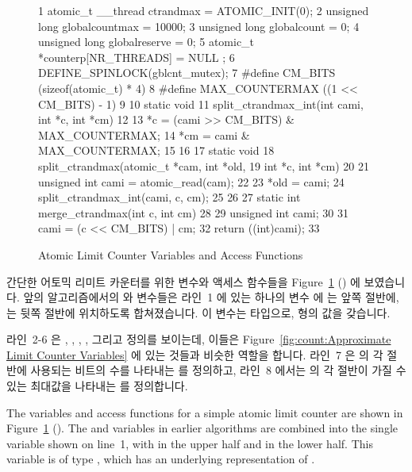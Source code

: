 \begin{figure}[tbp]
{ \scriptsize
\begin{verbbox}
  1 atomic_t __thread ctrandmax = ATOMIC_INIT(0);
  2 unsigned long globalcountmax = 10000;
  3 unsigned long globalcount = 0;
  4 unsigned long globalreserve = 0;
  5 atomic_t *counterp[NR_THREADS] = { NULL };
  6 DEFINE_SPINLOCK(gblcnt_mutex);
  7 #define CM_BITS (sizeof(atomic_t) * 4)
  8 #define MAX_COUNTERMAX ((1 << CM_BITS) - 1)
  9 
 10 static void
 11 split_ctrandmax_int(int cami, int *c, int *cm)
 12 {
 13   *c = (cami >> CM_BITS) & MAX_COUNTERMAX;
 14   *cm = cami & MAX_COUNTERMAX;
 15 }
 16 
 17 static void
 18 split_ctrandmax(atomic_t *cam, int *old,
 19                     int *c, int *cm)
 20 {
 21   unsigned int cami = atomic_read(cam);
 22 
 23   *old = cami;
 24   split_ctrandmax_int(cami, c, cm);
 25 }
 26 
 27 static int merge_ctrandmax(int c, int cm)
 28 {
 29   unsigned int cami;
 30 
 31   cami = (c << CM_BITS) | cm;
 32   return ((int)cami);
 33 }
\end{verbbox}
}
\centering
\theverbbox
\caption{Atomic Limit Counter Variables and Access Functions}
\label{fig:count:Atomic Limit Counter Variables and Access Functions}
\end{figure}

간단한 어토믹 리미트 카운터를 위한 변수와 액세스 함수들을
Figure~\ref{fig:count:Atomic Limit Counter Variables and Access Functions}
() 에 보였습니다.
앞의 알고리즘에서의  와  변수들은 라인~1 에 있는
하나의 변수  에  는 앞쪽 절반에,  는
뒷쪽 절반에 위치하도록 합쳐졌습니다.
이 변수는  타입으로,  형의 값을 갖습니다.

라인~2-6 은 , , ,
, 그리고  정의를 보이는데, 이들은
Figure~\ref{fig:count:Approximate Limit Counter Variables} 에 있는 것들과
비슷한 역할을 합니다.
라인~7 은  의 각 절반에 사용되는 비트의 수를 나타내는
를 정의하고, 라인~8 에서는  의 각 절반이 가질 수 있는
최대값을 나타내는  를 정의합니다.
\iffalse

The variables and access functions for a simple atomic limit counter
are shown in
Figure~\ref{fig:count:Atomic Limit Counter Variables and Access Functions}
().
The  and  variables in earlier algorithms
are combined into the single variable  shown on
line~1, with  in the upper half and  in
the lower half.
This variable is of type , which has an underlying
representation of .

